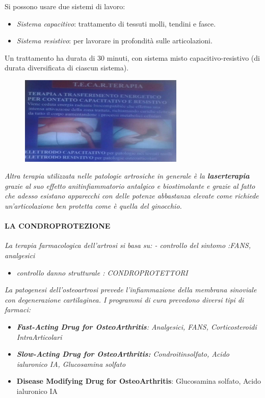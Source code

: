 Si possono usare due sistemi di lavoro:

\begin{itemize}
\item
  \emph{Sistema capacitivo}: trattamento di tessuti molli, tendini e
  fasce.
\item
  \emph{Sistema resistivo}: per lavorare in profondità sulle
  articolazioni.
\end{itemize}

Un trattamento ha durata di 30 minuti, con sistema misto
capacitivo-resistivo (di durata diversificata di ciascun sistema).
\begin{figure}[!ht]
\centering
	\includegraphics[width=0.7\textwidth]{031/image2.jpeg}
\end{figure}


\emph{Altra terapia utilizzata nelle patologie artrosiche in generale è la \textbf{laserterapia} grazie al suo effetto anitinfiammatorio antalgico e biostimolante e grazie al fatto che
adesso esistano apparecchi con delle potenze abbastanza elevate come
richiede un'articolazione ben protetta come è quella del ginocchio.}

\paragraph{LA CONDROPROTEZIONE}


\emph{La terapia farmacologica dell'artrosi si basa su: - controllo del
sintomo :FANS, analgesici}

\begin{itemize}
\item
  \emph{controllo danno strutturale : CONDROPROTETTORI}
\end{itemize}

\emph{La patogenesi dell'osteoartrosi prevede l'infiammazione della
membrana sinoviale con degenerazione cartilaginea. I programmi di cura
prevedono diversi tipi di farmaci:}

\begin{itemize}
\item
  \emph{\textbf{Fast-Acting Drug for OsteoArthritis}: Analgesici, FANS,
  Corticosteroidi IntraArticolari}
\item
  \emph{\textbf{Slow-Acting Drug for OsteoArthritis:} Condroitinsolfato,
  Acido ialuronico IA, Glucosamina solfato}
\item
  \textbf{Disease Modifying Drug for OsteoArthritis}: Glucosamina
  solfato, Acido ialuronico IA
\end{itemize}

